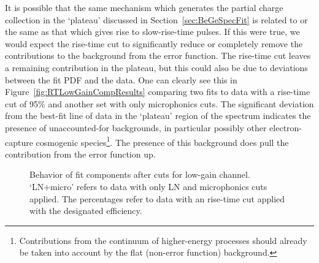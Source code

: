 It is possible that the same mechanism which generates the partial charge collection in the `plateau' discussed in Section~\ref{sec:BeGeSpecFit} is related to or the same as that which gives rise to slow-rise-time pulses.  If this were true, we would expect the rise-time cut to significantly reduce or completely remove the contributions to the background from the error function.  The rise-time cut leaves a remaining contribution in the plateau, but this could also be due to deviations between the fit PDF and the data.  One can clearly see this in Figure~\ref{fig:RTLowGainCompResults} comparing two fits to data with a rise-time cut of 95\% and another set with only microphonics cuts.  The significant deviation from the best-fit line of data in the `plateau' region of the spectrum indicates the presence of unaccounted-for backgrounds, in particular possibly other electron-capture cosmogenic species\footnote{Contributions from the continuum of higher-energy processes should already be taken into account by the flat (non-error function) background.}.  The presence of this background does pull the contribution from the error function up.  


						\begin{sidewaysfigure}
							\centering
							\caption[Behavior of fit components after cuts for low-gain channel]
							{Behavior of fit components after cuts for low-gain channel.  `LN+micro' refers to data with only
							LN and microphonics cuts applied.  The percentages refer to data with an rise-time cut applied
							with the designated efficiency.}
							\label{fig:RTSimLowGainResults}
						\end{sidewaysfigure}

